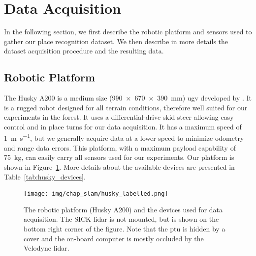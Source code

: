 \section{Data Acquisition}
\label{sec:chap_slam_data_acquisition}

In the following section, we first describe the robotic platform and sensors used to gather our place recognition dataset. We then describe in more details the dataset acquisition procedure and the resulting data.


\subsection{Robotic Platform}
\label{ssec:chap_slam_platform}

The Husky A200 is a medium size (\SI{990 x 670 x 390}{\milli\meter}) \gls*{ugv} developed by \cite{ClearpathWeb}. It is a rugged robot designed for all terrain conditions, therefore well suited for our experiments in the forest. It uses a differential-drive skid steer allowing easy control and in place turns for our data acquisition. It has a maximum speed of \SI{1}{\meter\per\second}, but we generally acquire data at a lower speed to minimize odometry and range data errors. This platform, with a maximum payload capability of \SI{75}{\kilo\gram}, can easily carry all sensors used for our experiments. Our platform is shown in Figure~\ref{fig:chap_slam_husky}. More details about the available devices are presented in Table~\ref{tab:husky_devices}.

\begin{figure}[H]
    \centering
    \texttt{[image: img/chap\_slam/husky\_labelled.png]}
    \caption{The robotic platform (Husky A200) and the devices used for data acquisition. The SICK \gls*{lidar} is not mounted, but is shown on the bottom right corner of the figure. Note that the \gls*{ptu} is hidden by a cover and the on-board computer is mostly occluded by the Velodyne \gls*{lidar}.}
    \label{fig:chap_slam_husky}
\end{figure}

